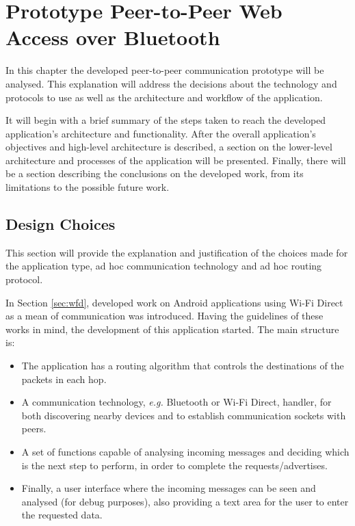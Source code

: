 \chapter{Prototype Peer-to-Peer Web Access over Bluetooth}
\label{chapter:work}

In this chapter the developed peer-to-peer communication prototype will be analysed. This explanation will address the decisions about the technology and protocols to use as well as the architecture and workflow of the application.

It will begin with a brief summary of the steps taken to reach the developed application's architecture and functionality. After the overall application's objectives and high-level architecture is described, a section on the lower-level architecture and processes of the application will be presented. Finally, there will be a section describing the conclusions on the developed work, from its limitations to the possible future work.

\section{Design Choices}

This section will provide the explanation and justification of the choices made for the application type, ad hoc communication technology and ad hoc routing protocol.

In Section \ref{sec:wfd}, developed work on Android applications using Wi-Fi Direct as a mean of communication was introduced. Having the guidelines of these works in mind, the development of this application started. The main structure is:

\begin{itemize}
	\item The application has a routing algorithm that controls the destinations of the packets in each hop.
	\item A communication technology, \textit{e.g.} Bluetooth or Wi-Fi Direct, handler, for both discovering nearby devices and to establish communication sockets with peers.
	\item A set of functions capable of analysing incoming messages and deciding which is the next step to perform, in order to complete the requests/advertises.
	\item Finally, a user interface where the incoming messages can be seen and analysed (for debug purposes), also providing a text area for the user to enter the requested data.
\end{itemize}

